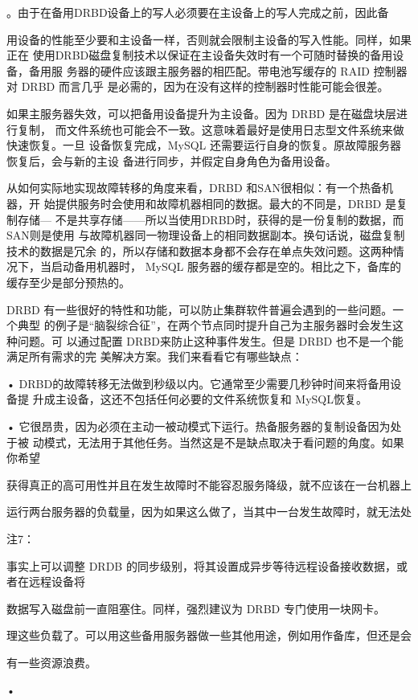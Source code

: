 。由于在备用DRBD设备上的写人必须要在主设备上的写人完成之前，因此备

用设备的性能至少要和主设备一样，否则就会限制主设备的写入性能。同样，如果正在
使用DRBD磁盘复制技术以保证在主设备失效时有一个可随时替换的备用设备，备用服
务器的硬件应该跟主服务器的相匹配。带电池写缓存的 RAID 控制器对 DRBD 而言几乎
是必需的，因为在没有这样的控制器时性能可能会很差。

如果主服务器失效，可以把备用设备提升为主设备。因为 DRBD 是在磁盘块层进行复制，
而文件系统也可能会不一致。这意味着最好是使用日志型文件系统来做快速恢复。一旦
设备恢复完成，MySQL 还需要运行自身的恢复。原故障服务器恢复后，会与新的主设
备进行同步，并假定自身角色为备用设备。

从如何实际地实现故障转移的角度来看，DRBD 和SAN很相似：有一个热备机器，开
始提供服务时会使用和故障机器相同的数据。最大的不同是，DRBD 是复制存储—
不是共享存储——所以当使用DRBD时，获得的是一份复制的数据，而SAN则是使用
与故障机器同一物理设备上的相同数据副本。换句话说，磁盘复制技术的数据是冗余
的，所以存储和数据本身都不会存在单点失效问题。这两种情况下，当启动备用机器时，
MySQL 服务器的缓存都是空的。相比之下，备库的缓存至少是部分预热的。

DRBD 有一些很好的特性和功能，可以防止集群软件普遍会遇到的一些问题。一个典型
的例子是“脑裂综合征”，在两个节点同时提升自己为主服务器时会发生这种问题。可
以通过配置 DRBD来防止这种事件发生。但是 DRBD 也不是一个能满足所有需求的完
美解决方案。我们来看看它有哪些缺点：

• DRBD的故障转移无法做到秒级以内。它通常至少需要几秒钟时间来将备用设备提
升成主设备，这还不包括任何必要的文件系统恢复和 MySQL恢复。

• 它很昂贵，因为必须在主动一被动模式下运行。热备服务器的复制设备因为处于被
动模式，无法用于其他任务。当然这是不是缺点取决于看问题的角度。如果你希望

获得真正的高可用性并且在发生故障时不能容忍服务降级，就不应该在一台机器上

运行两台服务器的负载量，因为如果这么做了，当其中一台发生故障时，就无法处

注7：

事实上可以调整 DRDB 的同步级别，将其设置成异步等待远程设备接收数据，或者在远程设备将

数据写入磁盘前一直阻塞住。同样，强烈建议为 DRBD 专门使用一块网卡。

理这些负载了。可以用这些备用服务器做一些其他用途，例如用作备库，但还是会

有一些资源浪费。

•

